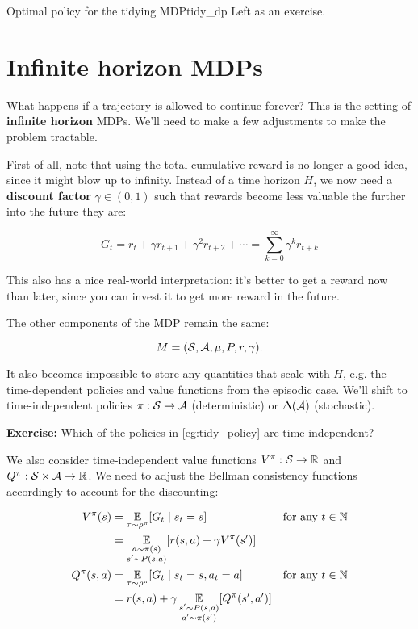 \documentclass[../main/main]{subfiles}
\begin{document}
\begin{example}{Optimal policy for the tidying MDP}{tidy_dp}
    Left as an exercise.
\end{example}

\newpage

\section{Infinite horizon MDPs}

What happens if a trajectory is allowed to continue forever? This is the setting of \textbf{infinite horizon} MDPs. We'll need to make a few adjustments to make the problem tractable.

First of all, note that using the total cumulative reward is no longer a good idea, since it might blow up to infinity. Instead of a time horizon $H$, we now need a \textbf{discount factor} $\gamma \in (0, 1)$ such that rewards become less valuable the further into the future they are:

\[
    G_t = r_t + \gamma r_{t+1} + \gamma^2 r_{t+2} + \cdots = \sum_{k=0}^\infty \gamma^k r_{t+k}
\]

This also has a nice real-world interpretation: it's better to get a reward now than later, since you can invest it to get more reward in the future.

The other components of the MDP remain the same:

\[ M = (\mathcal{S}, \mathcal{A}, \mu, P, r, \gamma). \]

It also becomes impossible to store any quantities that scale with $H$, e.g. the time-dependent policies and value functions from the episodic case. We'll shift to time-independent policies $\pi : \mathcal{S} \to \mathcal{A}$ (deterministic) or $\Delta(\mathcal{A})$ (stochastic).

\textbf{Exercise:} Which of the policies in \ref{eg:tidy_policy} are time-independent?

We also consider time-independent value functions $V^\pi : \mathcal{S} \to \mathbb{R}$ and $Q^\pi : \mathcal{S} \times \mathcal{A} \to \mathbb{R}$. We need to adjust the Bellman consistency functions accordingly to account for the discounting:

\begin{align*}
    V^\pi(s) &= \operatorname*{\mathbb{E}}_{\tau \sim \rho^\pi} [G_t \mid s_t = s] && \text{for any } t \in \mathbb{N} \\
    &= \operatorname*{\mathbb{E}}_{\substack{a \sim \pi(s) \\ s' \sim P(s, a)}} [r(s, a) + \gamma V^\pi(s')]\\
    Q^\pi(s, a) &= \operatorname*{\mathbb{E}}_{\tau \sim \rho^\pi} [G_t \mid s_t = s, a_t = a] && \text{for any } t \in \mathbb{N} \\
    &= r(s, a) + \gamma \operatorname*{\mathbb{E}}_{\substack{s' \sim P(s, a) \\ a' \sim \pi(s')}} [Q^\pi(s', a')]
\end{align*}
\end{document}
